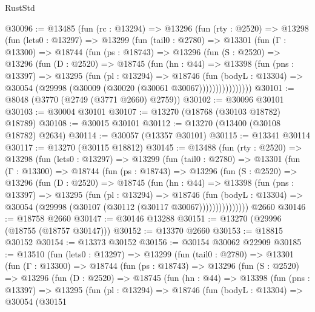 \begin{lexlean}{RustStd}
\begin{coremodule}
@30096 := @13485
    (fun (rc : @13294) =>
    @13296
      (fun (rty : @2520) =>
      @13298
        (fun (lets0 : @13297) =>
        @13299
          (fun (tail0 : @2780) =>
          @13301
            (fun (Γ : @13300) =>
            @18744
              (fun (ps : @18743) =>
              @13296
                (fun (S : @2520) =>
                @13296
                  (fun (D : @2520) =>
                  @18745
                    (fun (hn : @44) =>
                    @13398
                      (fun (pns : @13397) =>
                      @13295
                        (fun (pl : @13294) =>
                        @18746
                          (fun (bodyL : @13304) =>
                          @30054 (@29998 (@30009 (@30020 (@30061 @30067))))))))))))))))
@30101 := @8048 (@3770 (@2749 (@3771 @2660) @2759))
@30102 := @30096 @30101
@30103 := @30004 @30101
@30107 := @13270 (@18768 (@30103 @18782) @18789)
@30108 := @30015 @30101
@30112 := @13270 (@13400 (@30108 @18782) @2634)
@30114 := @30057 (@13357 @30101)
@30115 := @13341 @30114
@30117 := @13270 (@30115 @18812)
@30145 := @13488
    (fun (rty : @2520) =>
    @13298
      (fun (lets0 : @13297) =>
      @13299
        (fun (tail0 : @2780) =>
        @13301
          (fun (Γ : @13300) =>
          @18744
            (fun (ps : @18743) =>
            @13296
              (fun (S : @2520) =>
              @13296
                (fun (D : @2520) =>
                @18745
                  (fun (hn : @44) =>
                  @13398
                    (fun (pns : @13397) =>
                    @13295
                      (fun (pl : @13294) =>
                      @18746
                        (fun (bodyL : @13304) =>
                        @30054 (@29998 (@30107 (@30112 (@30117 @30067)))))))))))))))
    @2660
@30146 := @18758 @2660
@30147 := @30146 @13288
@30151 := @13270 (@29996 (@18755 (@18757 @30147)))
@30152 := @13370 @2660
@30153 := @18815 @30152
@30154 := @13373 @30152
@30156 := @30154 @30062 @22909
@30185 := @13510
    (fun (lets0 : @13297) =>
    @13299
      (fun (tail0 : @2780) =>
      @13301
        (fun (Γ : @13300) =>
        @18744
          (fun (ps : @18743) =>
          @13296
            (fun (S : @2520) =>
            @13296
              (fun (D : @2520) =>
              @18745
                (fun (hn : @44) =>
                @13398
                  (fun (pns : @13397) =>
                  @13295
                    (fun (pl : @13294) =>
                    @18746
                      (fun (bodyL : @13304) =>
                      @30054
                        (@30151

\end{coremodule}
\end{lexlean}
